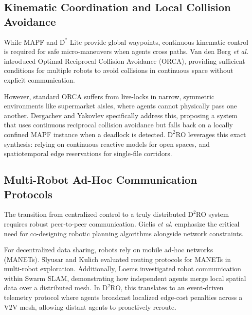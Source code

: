 \documentclass[journal]{IEEEtran}
\begin{document}
\subsection{Kinematic Coordination and Local Collision Avoidance}
While MAPF and $\text{D}^*$ Lite provide global waypoints, continuous kinematic control is required for safe micro-maneuvers when agents cross paths. Van den Berg \textit{et al.} \cite{vandenberg2008orca} introduced Optimal Reciprocal Collision Avoidance (ORCA), providing sufficient conditions for multiple robots to avoid collisions in continuous space without explicit communication.

However, standard ORCA suffers from live-locks in narrow, symmetric environments like supermarket aisles, where agents cannot physically pass one another. Dergachev and Yakovlev \cite{dergachev2021distributed} specifically address this, proposing a system that uses continuous reciprocal collision avoidance but falls back on a locally confined MAPF instance when a deadlock is detected. $\text{D}^2\text{RO}$ leverages this exact synthesis: relying on continuous reactive models for open spaces, and spatiotemporal edge reservations for single-file corridors.

\subsection{Multi-Robot Ad-Hoc Communication Protocols}
\label{sec:rel_comm}
The transition from centralized control to a truly distributed $\text{D}^2\text{RO}$ system requires robust peer-to-peer communication. Gielis \textit{et al.} \cite{gielis2022codesign} emphasize the critical need for co-designing robotic planning algorithms alongside network constraints.

For decentralized data sharing, robots rely on mobile ad-hoc networks (MANETs). Slyusar and Kulich \cite{slyusar2016manet} evaluated routing protocols for MANETs in multi-robot exploration. Additionally, Loems \cite{edwige2024swarmslam} investigated robot communication within Swarm SLAM, demonstrating how independent agents merge local spatial data over a distributed mesh. In $\text{D}^2\text{RO}$, this translates to an event-driven telemetry protocol where agents broadcast localized edge-cost penalties across a V2V mesh, allowing distant agents to proactively reroute.
\end{document}
